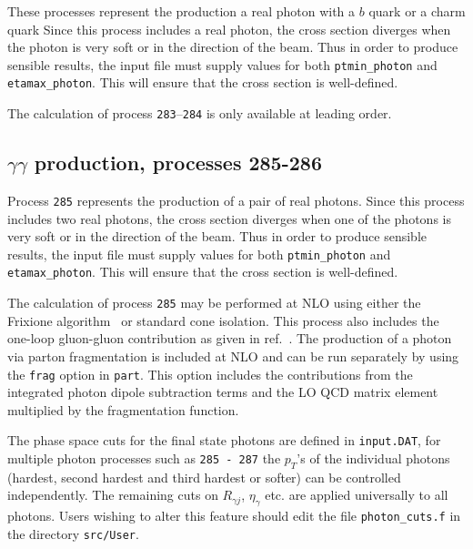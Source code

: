 \documentclass[12pt]{article}
\begin{document}
These processes represent the production a real photon with a $b$ quark
or a charm quark
Since this process includes a real photon, the cross section diverges
when the photon is very soft or in the direction of the beam.
Thus in order to produce sensible results, the input file must supply values for both
{\tt ptmin\_photon} and {\tt etamax\_photon}. This will ensure that
the cross section is well-defined.

The calculation of process {\tt 283}--{\tt 284} is only available at leading order.

\subsection{$\gamma\gamma$ production, processes 285-286}
\label{subsec:gamgam}

Process {\tt 285} represents the production of a pair of real photons.
Since this process includes two real photons, the cross section diverges
when one of the photons is very soft or in the direction of the beam.
Thus in order to produce sensible results, the input file must supply values for both
{\tt ptmin\_photon} and {\tt etamax\_photon}. This will ensure that
the cross section is well-defined.

The calculation of process {\tt 285} may be performed at NLO using either the
Frixione algorithm~\cite{Frixione:1998jh} or standard cone isolation.  This process also includes
the one-loop gluon-gluon contribution as given in
ref.~\cite{Bern:2002jx}.  The production of a photon via parton fragmentation is included at NLO and 
can be run separately by using the {\tt frag} option in {\tt part}. This option includes the contributions from the integrated 
photon dipole subtraction terms and the LO QCD matrix element multiplied by the fragmentation function.  


The phase space cuts for the final state photons are defined in {\tt{input.DAT}}, for multiple photon processes such 
as {\tt 285 - 287} the $p_T$'s of the individual photons (hardest, second hardest and third hardest or softer) can be controlled independently. 
The remaining cuts on $R_{\gamma j}$, $\eta_{\gamma}$ etc. are applied universally to all photons. Users wishing to alter
this feature should edit the file {\tt{photon\_cuts.f}} in the directory {\tt{src/User}}. 
\end{document}
